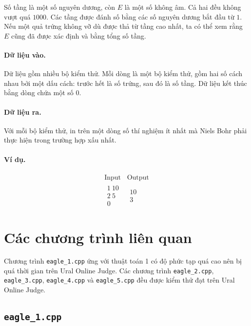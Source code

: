 \documentclass[11pt]{article}
\begin{document}
Số tầng là một số nguyên dương, còn $E$ là một số không âm. Cả hai đều không
vượt quá $1000$. Các tầng được đánh số bằng các số nguyên dương bắt đầu từ
$1$. Nếu một quả trứng không vỡ dù được thả từ tầng cao nhất, ta có thể xem
rằng $E$ cũng đã được xác định và bằng tổng số tầng.

\paragraph{Dữ liệu vào.}
Dữ liệu gồm nhiều bộ kiểm thử. Mỗi dòng là một bộ kiểm thử, gồm hai số cách
nhau bởi một dấu cách: trước hết là số trứng, sau đó là số tầng. Dữ liệu kết
thúc bằng dòng chứa một số $0$.

\paragraph{Dữ liệu ra.}
Với mỗi bộ kiểm thử, in trên một dòng số thí nghiệm ít nhất mà Niels Bohr phải
thực hiện trong trường hợp xấu nhất.

\paragraph{Ví dụ.}
\[
\begin{array}{l|l}
\text{Input} & \text{Output}\\
\hline
\begin{array}{l}
1\ 10\\
2\ 5\\
0
\end{array}
&
\begin{array}{l}
10\\
3
\end{array}
\end{array}
\]

\section{Các chương trình liên quan}

Chương trình \texttt{eagle\_1.cpp} ứng với thuật toán 1 có độ phức tạp quá cao
nên bị quá thời gian trên Ural Online Judge. Các chương trình
\texttt{eagle\_2.cpp}, \texttt{eagle\_3.cpp}, \texttt{eagle\_4.cpp} và
\texttt{eagle\_5.cpp} đều được kiểm thử đạt trên Ural Online Judge.

\subsection*{\texttt{eagle\_1.cpp}}
\end{document}
